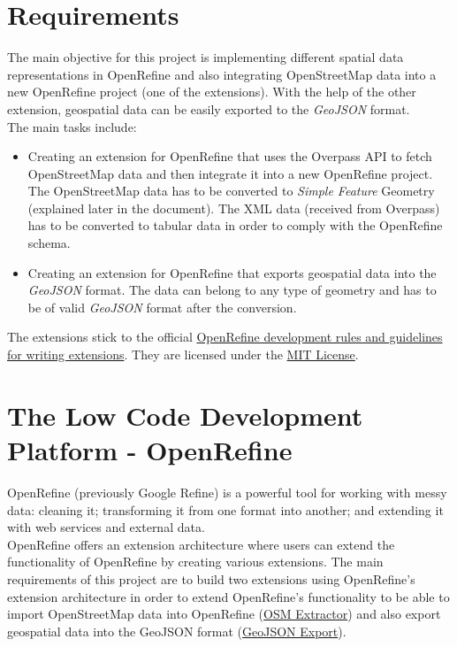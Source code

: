 \section{Requirements}
The main objective for this project is implementing different spatial data representations in OpenRefine and also integrating OpenStreetMap data into
a new OpenRefine project (one of the extensions). With the help of the other extension, geospatial data can be easily exported to the \textit{GeoJSON} format.\\
\newline
The main tasks include:
\begin{itemize}
   \item Creating an extension for OpenRefine that uses the Overpass API to fetch OpenStreetMap data and then integrate it into a new OpenRefine project.
    \subitem The OpenStreetMap data has to be converted to \textit{Simple Feature} Geometry (explained later in the document).
    \subitem The XML data (received from Overpass) has to be converted to tabular data in order to comply with the OpenRefine schema.
   \item Creating an extension for OpenRefine that exports geospatial data into the \textit{GeoJSON} format.
    \subitem  The data can belong to any type of geometry and has to be of valid \textit{GeoJSON} format after the conversion.
\end{itemize}
The extensions stick to the official \href{https://docs.openrefine.org/technical-reference/writing-extensions}{OpenRefine development rules and guidelines for writing extensions}. They are licensed
under the \href{https://opensource.org/licenses/MIT}{MIT License}.
\pagebreak
\section{The Low Code Development Platform - OpenRefine}
OpenRefine (previously Google Refine) is a powerful tool for working with messy data: cleaning it; transforming it from one format into another; and extending it with web services and external data. \cite{AboutOpenRefine}\\
\newline
OpenRefine offers an extension architecture where users can extend the functionality of OpenRefine by creating various extensions.
The main requirements of this project are to build two extensions using OpenRefine's extension architecture in order to extend OpenRefine's functionality to
be able to import OpenStreetMap data into OpenRefine (\hyperref[ch:the-osm-extractor-extension]{OSM Extractor}) and also export geospatial
data into the GeoJSON format (\hyperref[ch:the-geojson-export-extension]{GeoJSON Export}).

